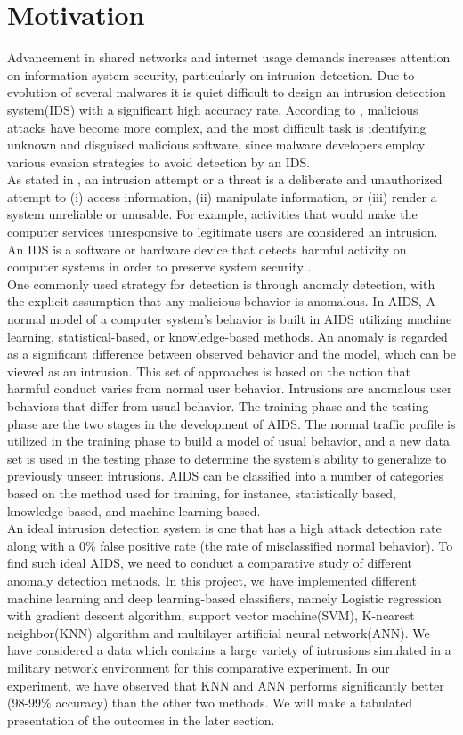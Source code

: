 \documentclass{llncs}
\begin{document}
\section{Motivation}
Advancement in shared networks and internet usage demands increases attention on information system security, particularly on intrusion detection. Due to evolution of several malwares it is quiet difficult to design an intrusion detection system(IDS) with a significant high accuracy rate. According to \cite{survey}, malicious attacks have become more complex, and the most difficult task is identifying unknown and disguised malicious software, since malware developers employ various evasion strategies to avoid detection by an IDS. \\
As stated in \cite{james2002computer}, an intrusion attempt or a threat is a deliberate and unauthorized attempt to (i) access information, (ii) manipulate information, or (iii) render a system unreliable or unusable. For example, activities that would make the computer services unresponsive to legitimate users are considered an intrusion. An IDS is a software or hardware device that detects harmful activity on computer systems in order to preserve system security \cite{LIAO201316}.\\
One commonly used strategy for detection is through anomaly detection, with the
explicit assumption that any malicious behavior is anomalous\cite{article1}. In AIDS, A normal model of a computer system's behavior is built in AIDS utilizing machine learning, statistical-based, or knowledge-based methods. An anomaly is regarded as a significant difference between observed behavior and the model, which can be viewed as an intrusion. This set of approaches is based on the notion that harmful conduct varies from normal user behavior.
Intrusions are anomalous user behaviors that differ from usual behavior. The training phase and the testing phase are the two stages in the development of AIDS. The normal traffic profile is utilized in the training phase to build a model of usual behavior, and a new data set is used in the testing phase to determine the system's ability to generalize to previously unseen intrusions. AIDS can be classified into a number of categories based on the method used for training, for instance, statistically based, knowledge-based, and machine learning-based\cite{survey}.\\
An ideal intrusion detection system is one that has a high attack detection rate along with a $ 0 \% $  false positive rate (the rate of misclassified normal behavior). To find such ideal AIDS, we need to conduct a comparative study of different anomaly detection methods. In this project, we have implemented different machine learning and deep learning-based classifiers, namely Logistic regression with gradient descent algorithm, support vector machine(SVM), K-nearest neighbor(KNN) algorithm and multilayer artificial neural network(ANN). We have considered a data which contains a large variety of intrusions simulated in a military network environment for this comparative experiment.  
In our experiment, we have observed that KNN and ANN performs significantly better (98-99$\% $ accuracy) than the other two methods. We will make a tabulated presentation of the outcomes in the later section.
\end{document}
